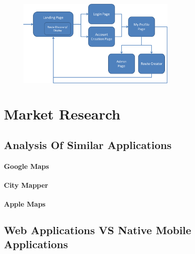 \documentclass[a4paper,twoside,notitlepage,11pt]{article}
\begin{document}
 \begin{figure}[!ht]
 \begin{center}
 \includegraphics[width=0.7\textwidth]{images/flow.png}
 \end{center}
 \vspace{-6mm}
 \end{figure}
 
 
\section{Market Research}
\subsection{Analysis Of Similar Applications}
\paragraph{Google Maps}
\paragraph{City Mapper}
\paragraph{Apple Maps}
\subsection{Web Applications VS Native Mobile Applications}
\end{document}
